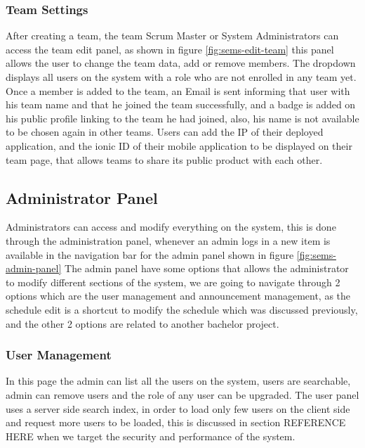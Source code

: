 \subsubsection{Team Settings}
\label{subs:team-settings}
After creating a team, the team Scrum Master or System Administrators can access the team edit panel, as shown in figure \ref{fig:sems-edit-team}
this panel allows the user to change the team data, add or remove members. The  dropdown displays all users on the system
with a  role who are not enrolled in any team yet. Once a member is added to the team, an Email is sent informing that user
with his team name and that he joined the team successfully, and a badge is added on his public profile linking to the team he had joined,
also, his name is not available to be chosen again in other teams. Users can add the IP of their deployed application, and the ionic ID of their
mobile application to be displayed on their team page, that allows teams to share its public product with each other.

\subsection{Administrator Panel}
\label{sub:admin-panel}
Administrators can access and modify everything on the system, this is done through the administration panel, whenever an admin logs in
a new item is available in the navigation bar for the admin panel shown in figure \ref{fig:sems-admin-panel}
\newParagraph
The admin panel have some options that allows the administrator to modify different sections of the system, we are going
to navigate through 2 options which are the user management and announcement management, as the schedule edit is a shortcut to modify
the schedule which was discussed previously, and the other 2 options are related to another bachelor project.

\subsubsection{User Management}
\label{subs:admin-users}
In this page the admin can list all the users on the system, users are searchable, admin can remove users and the role of any user
can be upgraded. The user panel uses a server side search index, in order to load only few users on the client side and request more
users to be loaded, this is discussed in section REFERENCE HERE when we target the security and performance of the system.

